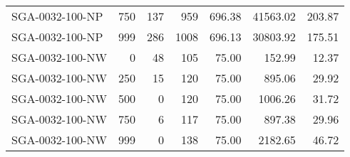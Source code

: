 \begin{table}[htbp]
{\begin{tabular}{lrrrrrr}
    SGA-0032-100-NP & 750    & 137    & 959    & 696.38 & 41563.02 & 203.87 \\
    SGA-0032-100-NP & 999    & 286    & 1008   & 696.13 & 30803.92 & 175.51 \\ \hline
    SGA-0032-100-NW & 0      & 48     & 105    & 75.00  & 152.99 & 12.37 \\
    SGA-0032-100-NW & 250    & 15     & 120    & 75.00  & 895.06 & 29.92 \\
    SGA-0032-100-NW & 500    & 0      & 120    & 75.00  & 1006.26 & 31.72 \\
    SGA-0032-100-NW & 750    & 6      & 117    & 75.00  & 897.38 & 29.96 \\
    SGA-0032-100-NW & 999    & 0      & 138    & 75.00  & 2182.65 & 46.72 \\
    \bottomrule
    \end{tabular}}
  \label{tab:addlabel}%
\end{table}%
